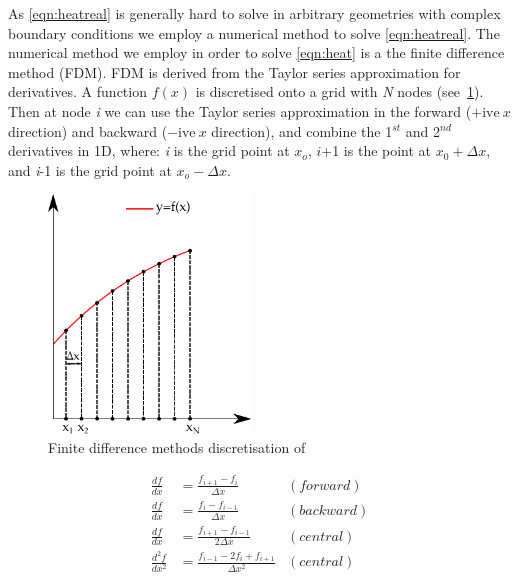 As \cref{eqn:heatreal} is generally hard to solve in arbitrary geometries with complex boundary conditions we employ a numerical method to solve \cref{eqn:heatreal}.
The numerical method we employ in order to solve \cref{eqn:heat} is a the finite difference method (FDM)\cite{ozisik1994finite}. FDM is derived from the Taylor series approximation for derivatives. A function $f(x)$ is discretised onto a grid with \textit{N} nodes (see~\cref{fig:fdmexplain}). Then at node \textit{i} we can use the Taylor series approximation in the forward ($+\text{ive}\ x$ direction) and backward ($-\text{ive}\ x$ direction), and combine the 1$^{st}$ and 2$^{nd}$ derivatives in 1D, where: \textit{i} is the grid point at $x_o$, $i$+1 is the point at $x_0+\Delta x$, and \textit{i}-1 is the grid point at $x_{o}-\Delta x$.

\begin{figure}
  \vspace{-10pt}
  \begin{center}
    \includegraphics[width=0.48\textwidth]{./ablation/images/fdm.pdf}
  \end{center}
  \caption{Finite difference methods discretisation of }\label{fig:fdmexplain}
    \vspace{-20pt}
\end{figure}

\begin{subequations}
\begin{align}
\frac{df}{dx} &= \frac{f_{i+1} - f_{i}}{\Delta x}  &(forward)\\
\frac{df}{dx} &= \frac{f_{i} - f_{i-1}}{\Delta x}  &(backward)\\
\frac{df}{dx} &= \frac{f_{i+1} - f_{i-1}}{2\Delta x}  &(central)\\
\frac{d^2f}{dx^2} &= \frac{f_{i-1}-2f_i+f_{i+1}}{\Delta x^2} &(central)
\end{align}
\end{subequations}


